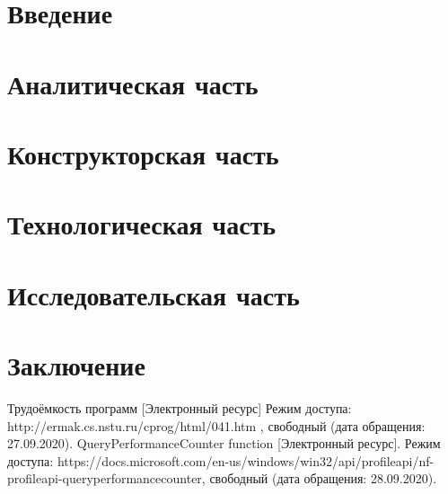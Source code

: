 \documentclass[10pt,a4paper]{report}
\begin{document}
	\renewcommand\bibname{Список литературы}
	
	
	
	\tableofcontents
	\newpage

	\chapter*{Введение}
	
	\newpage

	\chapter{Аналитическая часть}
	
	\newpage
	
	\chapter{Конструкторская часть}
	
	\newpage

	\chapter{Технологическая  часть}
			
	\newpage
	
	\chapter{Исследовательская часть}
	\setcounter{chapter}{4}
	
	\newpage
	
	\chapter*{Заключение}
	
	\newpage
	
	\makeatletter %
	\def\@biblabel#1{#1. }
	\makeatother
	\begin{thebibliography}{2}
		 Трудоёмкость программ [Электронный ресурс] Режим доступа: http://ermak.cs.nstu.ru/cprog/html/041.htm , свободный (дата обращения: 27.09.2020).
		 QueryPerformanceCounter function [Электронный ресурс]. Режим доступа: https://docs.microsoft.com/en-us/windows/win32/api/profileapi/nf-profileapi-queryperformancecounter, свободный (дата обращения: 28.09.2020).
	\end{thebibliography}
\end{document}
